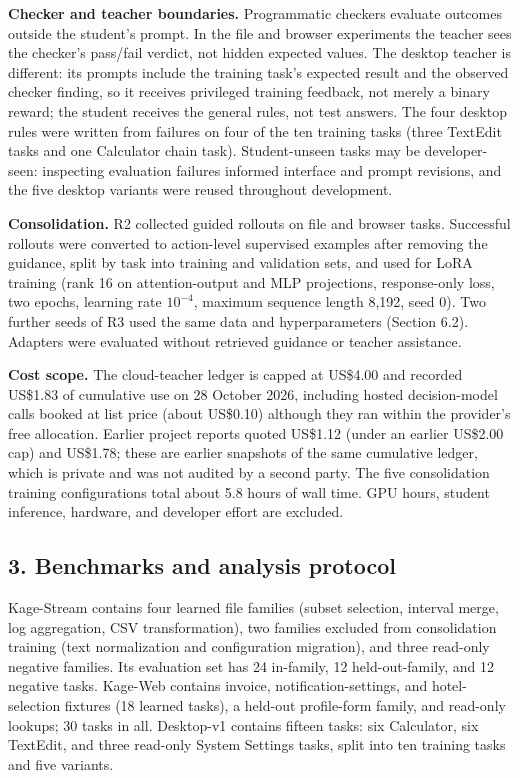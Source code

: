 \documentclass[
  10pt,
]{article}
\begin{document}
\textbf{Checker and teacher boundaries.} Programmatic checkers evaluate
outcomes outside the student's prompt. In the file and browser
experiments the teacher sees the checker's pass/fail verdict, not hidden
expected values. The desktop teacher is different: its prompts include
the training task's expected result and the observed checker finding, so
it receives privileged training feedback, not merely a binary reward;
the student receives the general rules, not test answers. The four
desktop rules were written from failures on four of the ten training
tasks (three TextEdit tasks and one Calculator chain task).
Student-unseen tasks may be developer-seen: inspecting evaluation
failures informed interface and prompt revisions, and the five desktop
variants were reused throughout development.

\textbf{Consolidation.} R2 collected guided rollouts on file and browser
tasks. Successful rollouts were converted to action-level supervised
examples after removing the guidance, split by task into training and
validation sets, and used for LoRA training (rank 16 on attention-output
and MLP projections, response-only loss, two epochs, learning rate
\(10^{-4}\), maximum sequence length 8,192, seed 0). Two further seeds
of R3 used the same data and hyperparameters (Section 6.2). Adapters
were evaluated without retrieved guidance or teacher assistance.

\textbf{Cost scope.} The cloud-teacher ledger is capped at US\$4.00 and
recorded US\$1.83 of cumulative use on 28 October 2026, including hosted
decision-model calls booked at list price (about US\$0.10) although they
ran within the provider's free allocation. Earlier project reports
quoted US\$1.12 (under an earlier US\$2.00 cap) and US\$1.78; these are
earlier snapshots of the same cumulative ledger, which is private and
was not audited by a second party. The five consolidation training
configurations total about 5.8 hours of wall time. GPU hours, student
inference, hardware, and developer effort are excluded.

\subsection{3. Benchmarks and analysis
protocol}\label{benchmarks-and-analysis-protocol}

Kage-Stream contains four learned file families (subset selection,
interval merge, log aggregation, CSV transformation), two families
excluded from consolidation training (text normalization and
configuration migration), and three read-only negative families. Its
evaluation set has 24 in-family, 12 held-out-family, and 12 negative
tasks. Kage-Web contains invoice, notification-settings, and
hotel-selection fixtures (18 learned tasks), a held-out profile-form
family, and read-only lookups; 30 tasks in all. Desktop-v1 contains
fifteen tasks: six Calculator, six TextEdit, and three read-only System
Settings tasks, split into ten training tasks and five variants.
\end{document}
